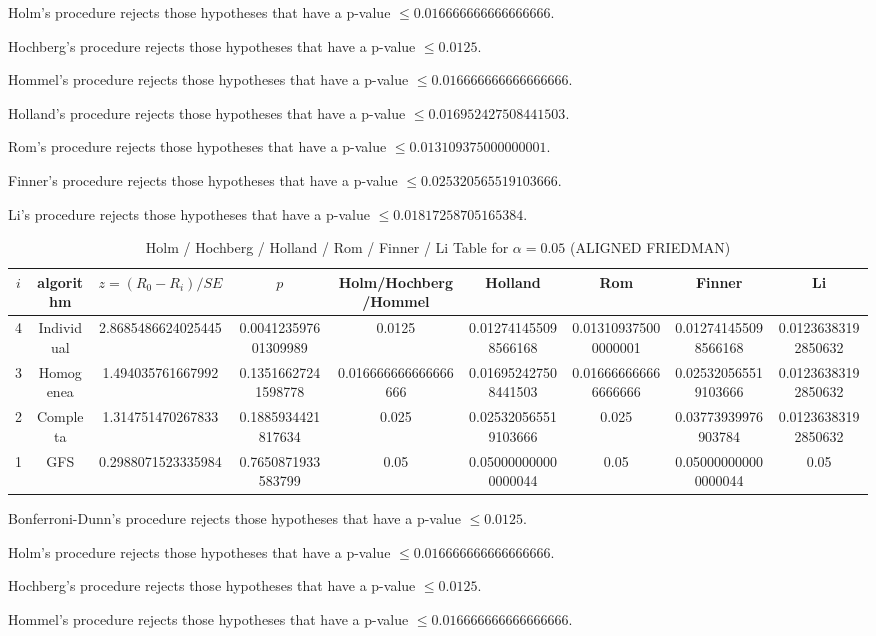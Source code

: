\documentclass[a4paper,10pt]{article}
\begin{document}
\begin{landscape}
Holm's procedure rejects those hypotheses that have a p-value $\le0.016666666666666666$.


Hochberg's procedure rejects those hypotheses that have a p-value $\le0.0125$.


Hommel's procedure rejects those hypotheses that have a p-value $\le0.016666666666666666$.


Holland's procedure rejects those hypotheses that have a p-value $\le0.016952427508441503$.


Rom's procedure rejects those hypotheses that have a p-value $\le0.013109375000000001$.


Finner's procedure rejects those hypotheses that have a p-value $\le0.025320565519103666$.


Li's procedure rejects those hypotheses that have a p-value $\le0.01817258705165384$.



\newpage

\begin{table}[!htp]
\centering\scriptsize
\caption{Holm / Hochberg / Holland / Rom / Finner / Li Table for $\alpha=0.05$ (ALIGNED FRIEDMAN)}
\begin{tabular}{ccccccccc}
$i$&algorithm&$z=(R_0 - R_i)/SE$&$p$&Holm/Hochberg/Hommel&Holland&Rom&Finner&Li\\
\hline
4&Individual&2.8685486624025445&0.004123597601309989&0.0125&0.012741455098566168&0.013109375000000001&0.012741455098566168&0.01236383192850632\\
3&Homogenea&1.494035761667992&0.13516627241598778&0.016666666666666666&0.016952427508441503&0.016666666666666666&0.025320565519103666&0.01236383192850632\\
2&Completa&1.314751470267833&0.1885934421817634&0.025&0.025320565519103666&0.025&0.03773939976903784&0.01236383192850632\\
1&GFS&0.2988071523335984&0.7650871933583799&0.05&0.050000000000000044&0.05&0.050000000000000044&0.05\\
\hline
\end{tabular}
\end{table}
Bonferroni-Dunn's procedure rejects those hypotheses that have a p-value $\le0.0125$.


Holm's procedure rejects those hypotheses that have a p-value $\le0.016666666666666666$.


Hochberg's procedure rejects those hypotheses that have a p-value $\le0.0125$.


Hommel's procedure rejects those hypotheses that have a p-value $\le0.016666666666666666$.



\end{landscape}
\end{document}
